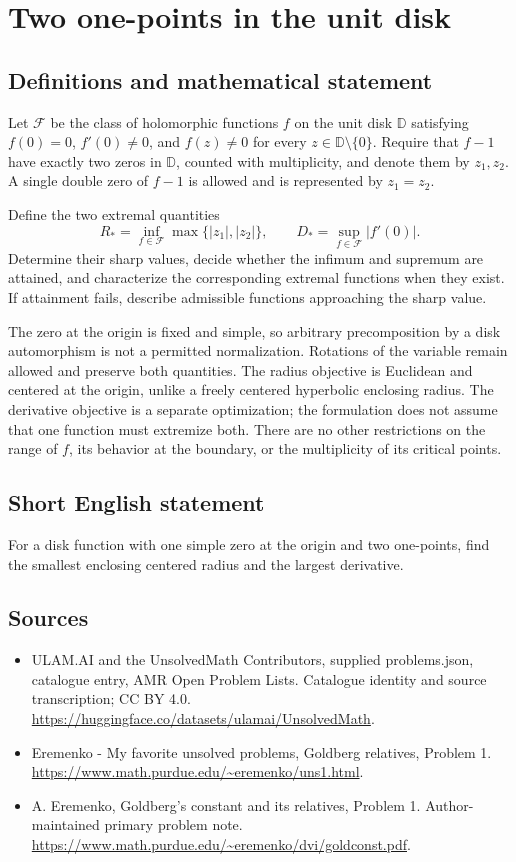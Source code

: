 \documentclass[11pt,a4paper]{article}
\begin{document}
\section*{Two one-points in the unit disk}\label{statement}

\subsection{Definitions and mathematical statement}
Let $\mathcal F$ be the class of holomorphic functions
$f$ on the unit disk $\mathbb D$ satisfying
$f(0)=0$, $f'(0)\ne0$, and $f(z)\ne0$ for every
$z\in\mathbb D\setminus\{0\}$. Require that $f-1$
have exactly two zeros in $\mathbb D$, counted with
multiplicity, and denote them by $z_1,z_2$.
A single double zero of $f-1$ is allowed and is
represented by $z_1=z_2$.

Define the two extremal quantities
\[
 R_*=\inf_{f\in\mathcal F}\max\{|z_1|,|z_2|\},
 \qquad
 D_*=\sup_{f\in\mathcal F}|f'(0)|.
\]
Determine their sharp values, decide whether the infimum
and supremum are attained, and characterize the
corresponding extremal functions when they exist.
If attainment fails, describe admissible functions approaching
the sharp value.

The zero at the origin is fixed and simple, so arbitrary
precomposition by a disk automorphism is not a permitted
normalization. Rotations of the variable remain allowed
and preserve both quantities. The radius objective is
Euclidean and centered at the origin, unlike a freely
centered hyperbolic enclosing radius.
The derivative objective is a separate optimization;
the formulation does not assume that one function must
extremize both. There are no other restrictions on the
range of $f$, its behavior at the boundary, or the
multiplicity of its critical points.
\subsection{Short English statement}
For a disk function with one simple zero at the origin and two one-points, find the smallest enclosing centered radius and the largest derivative.
\subsection{Sources}
\begin{itemize}
\item[S1] ULAM.AI and the UnsolvedMath Contributors, supplied problems.json, catalogue entry, AMR Open Problem Lists. Catalogue identity and source transcription; CC BY 4.0.
\url{https://huggingface.co/datasets/ulamai/UnsolvedMath}.
\item[S2] Eremenko - My favorite unsolved problems, Goldberg relatives, Problem 1. 
\url{https://www.math.purdue.edu/~eremenko/uns1.html}.
\item[S3] A. Eremenko, Goldberg's constant and its relatives, Problem 1. Author-maintained primary problem note.
\url{https://www.math.purdue.edu/~eremenko/dvi/goldconst.pdf}.
\end{itemize}
\end{document}

